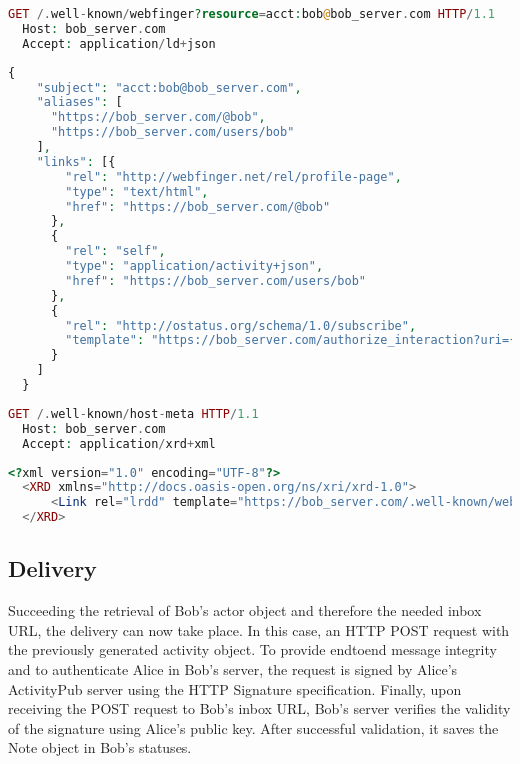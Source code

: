 \begin{lstlisting}[language=PHP, caption=Webfinger request, label=fig:webfinger_request]
  GET /.well-known/webfinger?resource=acct:bob@bob_server.com HTTP/1.1
  Host: bob_server.com
  Accept: application/ld+json
\end{lstlisting}

\lstset{style=JSONStyle}
\begin{lstlisting}[language=PHP, caption=JRD Document, label=fig:jrd_document, float=h]
  {
    "subject": "acct:bob@bob_server.com",
    "aliases": [
      "https://bob_server.com/@bob",
      "https://bob_server.com/users/bob"
    ],
    "links": [{
        "rel": "http://webfinger.net/rel/profile-page",
        "type": "text/html",
        "href": "https://bob_server.com/@bob"
      },
      {
        "rel": "self",
        "type": "application/activity+json",
        "href": "https://bob_server.com/users/bob"
      },
      {
        "rel": "http://ostatus.org/schema/1.0/subscribe",
        "template": "https://bob_server.com/authorize_interaction?uri={uri}"
      }
    ]
  }
\end{lstlisting}

\begin{lstlisting}[language=PHP, caption=Hostmeta request, label=fig:hostmeta_request, float=h]
  GET /.well-known/host-meta HTTP/1.1
  Host: bob_server.com
  Accept: application/xrd+xml
\end{lstlisting}

\lstset{style=JSONStyle}
\begin{lstlisting}[language=PHP,caption=Hostmeta response, label=fig:hostmeta_response, float=h]
  <?xml version="1.0" encoding="UTF-8"?>
  <XRD xmlns="http://docs.oasis-open.org/ns/xri/xrd-1.0">
      <Link rel="lrdd" template="https://bob_server.com/.well-known/webfinger?resource={uri}"/>
  </XRD>
\end{lstlisting}


\subsection{Delivery}
Succeeding the retrieval of Bob's actor object and therefore the needed inbox URL, the delivery can now take place. In this case, an HTTP POST request with the previously generated activity object. To provide end\-to\-end message integrity and to authenticate Alice in Bob's server, the request is signed by Alice's ActivityPub server using the HTTP Signature specification.
Finally, upon receiving the POST request to Bob's inbox URL, Bob's server verifies the validity of the signature using Alice's public key. After successful validation, it saves the Note object in Bob's statuses. 

